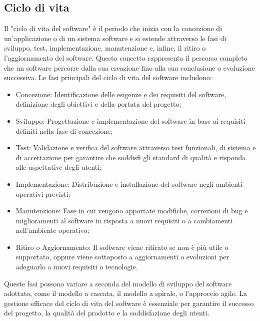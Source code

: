 \documentclass{article}
\begin{document}
\subsection{Ciclo di vita}
Il "ciclo di vita del software" è il periodo che inizia con la concezione di un'applicazione o di un sistema software e si estende attraverso le fasi di sviluppo, test, implementazione, manutenzione e, infine, il ritiro o l'aggiornamento del software. Questo concetto rappresenta il percorso completo che un software percorre dalla sua creazione fino alla sua conclusione o evoluzione successiva. Le fasi principali del ciclo di vita del software includono:
\begin{itemize}
    \item Concezione: Identificazione delle esigenze e dei requisiti del software, definizione degli obiettivi e della portata del progetto;
    \item Sviluppo: Progettazione e implementazione del software in base ai requisiti definiti nella fase di concezione;
    \item Test: Validazione e verifica del software attraverso test funzionali, di sistema e di accettazione per garantire che soddisfi gli standard di qualità e risponda alle aspettative degli utenti;
    \item Implementazione: Distribuzione e installazione del software negli ambienti operativi previsti;
    \item Manutenzione: Fase in cui vengono apportate modifiche, correzioni di bug e miglioramenti al software in risposta a nuovi requisiti o a cambiamenti nell'ambiente operativo;
    \item Ritiro o Aggiornamento: Il software viene ritirato se non è più utile o supportato, oppure viene sottoposto a aggiornamenti o evoluzioni per adeguarlo a nuovi requisiti o tecnologie.
\end{itemize}
Queste fasi possono variare a seconda del modello di sviluppo del software adottato, come il modello a cascata, il modello a spirale, o l'approccio agile. La gestione efficace del ciclo di vita del software è essenziale per garantire il successo del progetto, la qualità del prodotto e la soddisfazione degli utenti.
\end{document}
